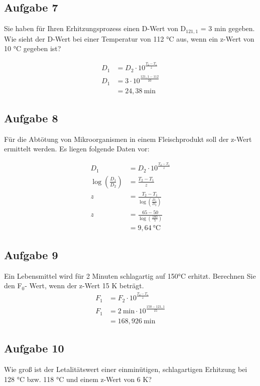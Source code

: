 \documentclass[a4paper,10pt]{article}
\begin{document}
\pp
\subsection{Aufgabe 7}
Sie haben für Ihren Erhitzungsprozess einen D-Wert von D$_{121,1}$ = 3 min gegeben. Wie sieht
der D-Wert bei einer Temperatur von 112 °C aus, wenn ein z-Wert von 10 °C gegeben ist?

\begin{align*}
D_1 &= D_2 \cdot 10^{\frac{T_2-T_1}{z}} \\
D_1 &= 3 \cdot 10^{\frac{121,1-112}{10}} \\
 &= 24,38 ~\text{min}
\end{align*}

\pp
\subsection{Aufgabe 8}
Für die Abtötung von Mikroorganismen in einem Fleischprodukt soll der z-Wert ermittelt
werden. Es liegen folgende Daten vor:
\pp
\begin{center}
\end{center}
\begin{align*}
D_1 &= D_2 \cdot 10^{\frac{T_2-T_1}{z}} \\
\log(\frac{D_1}{D_2}) &= \frac{T_2-T_1}{z} \\
z &= \frac{T_2 - T_1}{\log(\frac{D_1}{D_2})} \\
z &= \frac{65 - 50}{\log(\frac{180}{5})} \\ 
 &= 9,64  ~\text{°C}
\end{align*}

\pp
\subsection{Aufgabe 9}
Ein Lebensmittel wird für 2 Minuten schlagartig auf 150°C erhitzt. Berechnen Sie den F$_0$-
Wert, wenn der z-Wert 15 K beträgt.
\begin{align*}
F_1 &= F_2 \cdot 10^{\frac{T_2-T_1}{z}} \\
F_1 &= 2 ~\text{min} \cdot 10^{\frac{150-121,1}{15}} \\
 &= 168,926 ~\text{min}
\end{align*}

\pp
\subsection{Aufgabe 10}
Wie groß ist der Letalitätswert einer einminütigen, schlagartigen Erhitzung bei 128 °C
bzw. 118 °C und einem z-Wert von 6 K?
\end{document}

